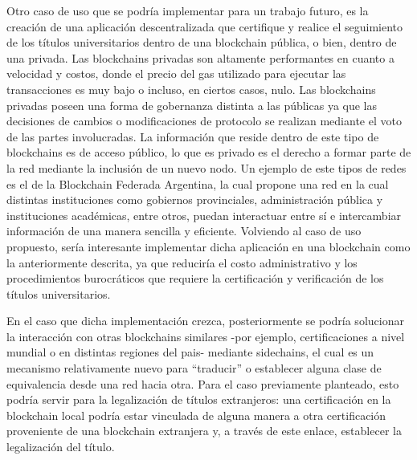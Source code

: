 Otro caso de uso que se podría implementar para un trabajo futuro, es la creación de una aplicación descentralizada que certifique y realice el seguimiento de los títulos universitarios dentro de una blockchain pública, o bien, dentro de una privada. Las blockchains privadas son altamente performantes en cuanto a velocidad y costos, donde el precio del gas utilizado para ejecutar las transacciones es muy bajo o incluso, en ciertos casos, nulo.
Las blockchains privadas poseen una forma de gobernanza distinta a las públicas ya que las decisiones de cambios o modificaciones de protocolo se realizan mediante el voto de las partes involucradas. La información que reside dentro de este tipo de blockchains es de acceso público, lo que es privado es el derecho a formar parte de la red mediante la inclusión de un nuevo nodo. Un ejemplo de este tipos de redes es el de la Blockchain Federada Argentina\cite{Bfa2019}, la cual propone una red en la cual distintas instituciones como  gobiernos provinciales, administración pública y instituciones académicas, entre otros, puedan interactuar entre sí e intercambiar información de una manera sencilla y eficiente. Volviendo al caso de uso propuesto, sería interesante implementar dicha aplicación en una blockchain como la anteriormente descrita, ya que reduciría el costo administrativo y los procedimientos burocráticos que requiere la certificación y verificación de los títulos universitarios.

En el caso que dicha implementación crezca, posteriormente se podría solucionar la interacción con otras blockchains similares -por ejemplo, certificaciones a nivel mundial o en distintas regiones del pais- mediante sidechains\cite{Sidechain2019}, el cual es un mecanismo relativamente nuevo para ``traducir'' o establecer alguna clase de equivalencia desde una red hacia otra. Para el caso previamente planteado, esto podría servir para la legalización de títulos extranjeros: una certificación en la blockchain local podría estar vinculada de alguna manera a otra certificación proveniente de una blockchain extranjera y, a través de este enlace, establecer la legalización del título.
